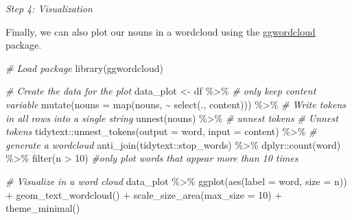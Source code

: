 \documentclass[
]{book}
\newenvironment{Shaded}{\begin{snugshade}}{\end{snugshade}}
\newcommand{\AttributeTok}[1]{\textcolor[rgb]{0.77,0.63,0.00}{#1}}
\newcommand{\CommentTok}[1]{\textcolor[rgb]{0.56,0.35,0.01}{\textit{#1}}}
\newcommand{\DecValTok}[1]{\textcolor[rgb]{0.00,0.00,0.81}{#1}}
\newcommand{\FunctionTok}[1]{\textcolor[rgb]{0.00,0.00,0.00}{#1}}
\newcommand{\NormalTok}[1]{#1}
\newcommand{\OtherTok}[1]{\textcolor[rgb]{0.56,0.35,0.01}{#1}}
\newcommand{\SpecialCharTok}[1]{\textcolor[rgb]{0.00,0.00,0.00}{#1}}
\begin{document}
\emph{Step 4: Visualization}

Finally, we can also plot our nouns in a wordcloud using the \href{\%22https://cran.r-project.org/web/packages/ggwordcloud/vignettes/ggwordcloud.html\%22}{ggwordcloud} package.

\begin{Shaded}
\begin{Highlighting}[]
\CommentTok{\# Load package}
\FunctionTok{library}\NormalTok{(ggwordcloud)}
\end{Highlighting}
\end{Shaded}

\begin{Shaded}
\begin{Highlighting}[]
\CommentTok{\# Create the data for the plot}
\NormalTok{data\_plot }\OtherTok{\textless{}{-}}\NormalTok{ df }\SpecialCharTok{\%\textgreater{}\%} 
  \CommentTok{\# only keep content variable}
  \FunctionTok{mutate}\NormalTok{(}\AttributeTok{nouns =} \FunctionTok{map}\NormalTok{(nouns, }
                            \SpecialCharTok{\textasciitilde{}} \FunctionTok{select}\NormalTok{(., content))) }\SpecialCharTok{\%\textgreater{}\%} 
  \CommentTok{\# Write tokens in all rows into a single string}
  \FunctionTok{unnest}\NormalTok{(nouns) }\SpecialCharTok{\%\textgreater{}\%} \CommentTok{\# unnest tokens}
  \CommentTok{\# Unnest tokens}
\NormalTok{  tidytext}\SpecialCharTok{::}\FunctionTok{unnest\_tokens}\NormalTok{(}\AttributeTok{output =}\NormalTok{ word, }\AttributeTok{input =}\NormalTok{ content) }\SpecialCharTok{\%\textgreater{}\%} \CommentTok{\# generate a wordcloud}
  \FunctionTok{anti\_join}\NormalTok{(tidytext}\SpecialCharTok{::}\NormalTok{stop\_words) }\SpecialCharTok{\%\textgreater{}\%}
\NormalTok{  dplyr}\SpecialCharTok{::}\FunctionTok{count}\NormalTok{(word) }\SpecialCharTok{\%\textgreater{}\%}
  \FunctionTok{filter}\NormalTok{(n }\SpecialCharTok{\textgreater{}} \DecValTok{10}\NormalTok{) }\CommentTok{\#only plot words that appear more than 10 times}

\CommentTok{\# Visualize in a word cloud}
\NormalTok{data\_plot }\SpecialCharTok{\%\textgreater{}\%}
  \FunctionTok{ggplot}\NormalTok{(}\FunctionTok{aes}\NormalTok{(}\AttributeTok{label =}\NormalTok{ word, }
             \AttributeTok{size =}\NormalTok{ n)) }\SpecialCharTok{+}
  \FunctionTok{geom\_text\_wordcloud}\NormalTok{() }\SpecialCharTok{+}
  \FunctionTok{scale\_size\_area}\NormalTok{(}\AttributeTok{max\_size =} \DecValTok{10}\NormalTok{) }\SpecialCharTok{+}
  \FunctionTok{theme\_minimal}\NormalTok{()}
\end{Highlighting}
\end{Shaded}
\end{document}
